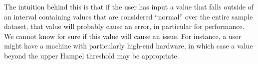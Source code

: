The intuition behind this is that if the user has input a value 
that falls outside of an interval containing values that are considered 
``normal'' over the entire sample dataset, 
that value will probably cause an error, in particular for performance. 
We cannot know for sure if this value will cause an issue. 
For instance, a user might have a machine with 
particularly high-end hardware, 
in which case a value beyond the upper Hampel threshold may be appropriate. 
